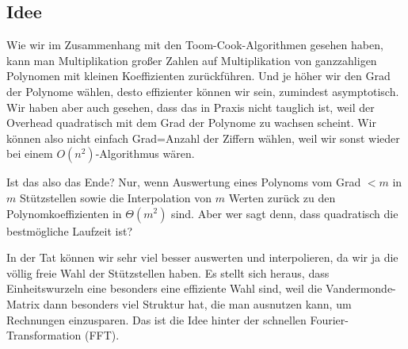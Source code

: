 
\subsection{Idee}

\begin{remark}
    Wie wir im Zusammenhang mit den Toom-Cook-Algorithmen gesehen haben, kann man Multiplikation großer Zahlen auf Multiplikation von ganzzahligen Polynomen mit kleinen Koeffizienten zurückführen. Und je höher wir den Grad der Polynome wählen, desto effizienter können wir sein, zumindest asymptotisch. Wir haben aber auch gesehen, dass das in Praxis nicht tauglich ist, weil der Overhead quadratisch mit dem Grad der Polynome zu wachsen scheint. Wir können also nicht einfach Grad=Anzahl der Ziffern wählen, weil wir sonst wieder bei einem $O(n^2)$-Algorithmus wären.

    \medbreak
    Ist das also das Ende? Nur, wenn Auswertung eines Polynoms vom Grad $<m$ in $m$ Stützstellen sowie die Interpolation von $m$ Werten zurück zu den Polynomkoeffizienten in $\Theta(m^2)$ sind. Aber wer sagt denn, dass quadratisch die bestmögliche Laufzeit ist?

    In der Tat können wir sehr viel besser auswerten und interpolieren, da wir ja die völlig freie Wahl der Stützstellen haben. Es stellt sich heraus, dass Einheitswurzeln eine besonders eine effiziente Wahl sind, weil die Vandermonde-Matrix dann besonders viel Struktur hat, die man ausnutzen kann, um Rechnungen einzusparen. Das ist die Idee hinter der schnellen Fourier-Transformation (FFT).
\end{remark}
